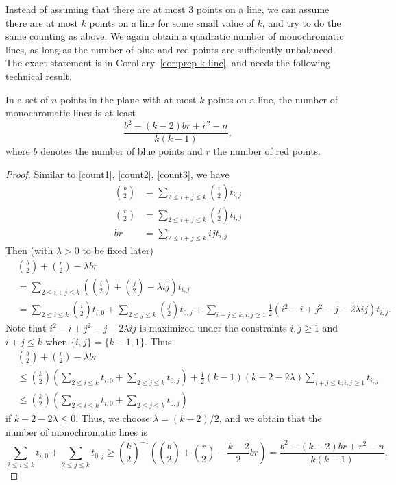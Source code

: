 \documentclass[a4paper,11pt,leqno]{article}
\begin{document}
Instead of assuming that there are at most $3$ points on a line, we can assume there are at most $k$ points on a line for some small value of $k$, and try to do the same counting as above.
We again obtain a quadratic number of monochromatic lines, as long as the number of blue and red points are sufficiently unbalanced.
The exact statement is in Corollary~\ref{cor:prep-k-line}, and needs the following technical result. 


\begin{proposition}\label{prep-k-line}
In a set of $n$ points in the plane with at most $k$ points on a line, the number of monochromatic lines is at least \[\frac{b^2-(k-2)br+r^2-n}{k(k-1)},\] where $b$ denotes the number of blue points and $r$ the number of red points.
\end{proposition}


\begin{proof}
Similar to \eqref{count1}, \eqref{count2}, \eqref{count3}, we have
\begin{align}
    \binom{b}{2} &= \sum_{2\leq i+j\leq k}\binom{i}{2}t_{i,j}\\
    \binom{r}{2} &= \sum_{2\leq i+j\leq k}\binom{j}{2}t_{i,j}\\
    br &= \sum_{2\leq i+j\leq k}ijt_{i,j}
\end{align}
Then (with $\lambda > 0$ to be fixed later)
\begin{align*}
&\binom{b}{2}+\binom{r}{2}-\lambda br\\
&= \sum_{2\leq i+j\leq k}\left(\binom{i}{2}+\binom{j}{2}-\lambda ij\right)t_{i,j}\\
&= \sum_{2\leq i\leq k}\binom{i}{2}t_{i,0} + \sum_{2\leq j\leq k}\binom{j}{2}t_{0,j} + \sum_{i+j\leq k; i,j\geq 1} \frac12\left(i^2-i+j^2-j-2\lambda i j\right)t_{i,j}.
\end{align*}
Note that $i^2-i+j^2-j-2\lambda ij$ is maximized under the constraints $i,j\geq 1$ and $i+j\leq k$ when $\{i,j\}=\{k-1,1\}$.
Thus
\begin{align*}
    & \binom{b}{2}+\binom{r}{2}-\lambda br\\
    & \leq \binom{k}{2}\left(\sum_{2\leq i\leq k}t_{i,0} + \sum_{2\leq j\leq k}t_{0,j}\right) + \frac12(k-1)(k-2-2\lambda)\sum_{i+j\leq k; i,j\geq 1}t_{i,j}\\
    &\leq \binom{k}{2}\left(\sum_{2\leq i\leq k}t_{i,0} + \sum_{2\leq j\leq k}t_{0,j}\right)
\end{align*}
if $k-2-2\lambda\leq 0$.
Thus, we choose $\lambda = (k-2)/2$, and we obtain that the number of monochromatic lines is 
\[\sum_{2\leq i\leq k}t_{i,0} + \sum_{2\leq j\leq k}t_{0,j} \geq \binom{k}{2}^{-1}\left(\binom{b}{2}+\binom{r}{2}-\frac{k-2}{2}br\right) = \frac{b^2-(k-2)br+r^2-n}{k(k-1)}.\]
\end{proof}
\end{document}
